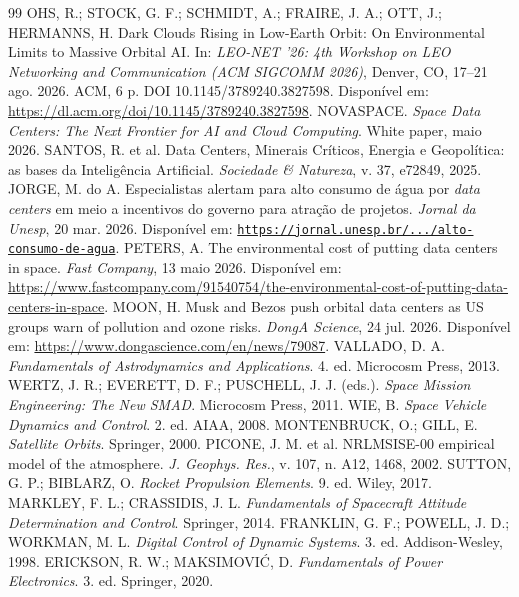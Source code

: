 \documentclass[11pt,a4paper]{article}
\begin{document}
\begin{thebibliography}{99}
 OHS, R.; STOCK, G. F.; SCHMIDT, A.; FRAIRE, J. A.; OTT, J.; HERMANNS, H. Dark Clouds Rising in Low-Earth Orbit: On Environmental Limits to Massive Orbital AI. In: \emph{LEO-NET '26: 4th Workshop on LEO Networking and Communication (ACM SIGCOMM 2026)}, Denver, CO, 17--21 ago. 2026. ACM, 6 p. DOI 10.1145/3789240.3827598. Disponível em: \url{https://dl.acm.org/doi/10.1145/3789240.3827598}.
 NOVASPACE. \emph{Space Data Centers: The Next Frontier for AI and Cloud Computing}. White paper, maio 2026.
 SANTOS, R. et al. Data Centers, Minerais Críticos, Energia e Geopolítica: as bases da Inteligência Artificial. \emph{Sociedade \& Natureza}, v. 37, e72849, 2025.
 JORGE, M. do A. Especialistas alertam para alto consumo de água por \emph{data centers} em meio a incentivos do governo para atração de projetos. \emph{Jornal da Unesp}, 20 mar. 2026. Disponível em: \href{https://jornal.unesp.br/2026/03/20/especialistas-alertam-para-alto-consumo-de-agua-por-data-centers-em-meio-a-incentivos-do-governo-para-atracao-de-projetos/}{\nolinkurl{https://jornal.unesp.br/.../alto-consumo-de-agua}}.
 PETERS, A. The environmental cost of putting data centers in space. \emph{Fast Company}, 13 maio 2026. Disponível em: \url{https://www.fastcompany.com/91540754/the-environmental-cost-of-putting-data-centers-in-space}.
 MOON, H. Musk and Bezos push orbital data centers as US groups warn of pollution and ozone risks. \emph{DongA Science}, 24 jul. 2026. Disponível em: \url{https://www.dongascience.com/en/news/79087}.
 VALLADO, D. A. \emph{Fundamentals of Astrodynamics and Applications}. 4. ed. Microcosm Press, 2013.
 WERTZ, J. R.; EVERETT, D. F.; PUSCHELL, J. J. (eds.). \emph{Space Mission Engineering: The New SMAD}. Microcosm Press, 2011.
 WIE, B. \emph{Space Vehicle Dynamics and Control}. 2. ed. AIAA, 2008.
 MONTENBRUCK, O.; GILL, E. \emph{Satellite Orbits}. Springer, 2000.
 PICONE, J. M. et al. NRLMSISE-00 empirical model of the atmosphere. \emph{J. Geophys. Res.}, v. 107, n. A12, 1468, 2002.
 SUTTON, G. P.; BIBLARZ, O. \emph{Rocket Propulsion Elements}. 9. ed. Wiley, 2017.
 MARKLEY, F. L.; CRASSIDIS, J. L. \emph{Fundamentals of Spacecraft Attitude Determination and Control}. Springer, 2014.
 FRANKLIN, G. F.; POWELL, J. D.; WORKMAN, M. L. \emph{Digital Control of Dynamic Systems}. 3. ed. Addison-Wesley, 1998.
 ERICKSON, R. W.; MAKSIMOVIĆ, D. \emph{Fundamentals of Power Electronics}. 3. ed. Springer, 2020.

\end{thebibliography}
\end{document}
